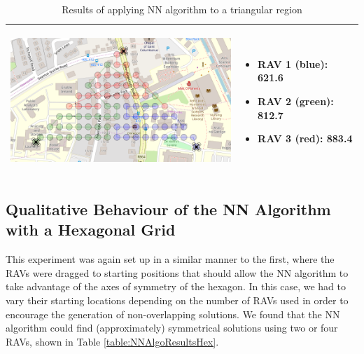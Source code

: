 \begin{table}[H]
\begin{tabular}{ | c | m{5cm} | }
    \begin{minipage}[c][57mm][c]{.6\textwidth}
      \includegraphics[width=\linewidth, height=55mm]{Chapters/MultiAgentCoverage/MultipleTravellingSalesman/Figs/Triangle/ThreeRAV.PNG}
    \end{minipage}
    &
    \begin{itemize}[leftmargin=*]
    \item[] RAV 1 (blue): 621.6
    \item[] RAV 2 (green): 812.7
    \item[] RAV 3 (red): 883.4
    \end{itemize}
    \\
    \hline
  \end{tabular}
  \caption{Results of applying NN algorithm to a triangular region}\label{table:NNAlgoResultsTri}
\end{table}





\pagebreak
\subsection{Qualitative Behaviour of the NN Algorithm with a Hexagonal Grid}
This experiment was again set up in a similar manner to the first, where the RAVs were dragged to starting positions that should allow the NN algorithm to take advantage of the axes of symmetry of the hexagon. In this case, we had to vary their starting locations depending on the number of RAVs used in order to encourage the generation of non-overlapping solutions. We found that the NN algorithm could find (approximately) symmetrical solutions using two or four RAVs, shown in Table \ref{table:NNAlgoResultsHex}.



